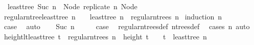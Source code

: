\begin{isabellebody}
\ \ {\isachardoublequoteopen}least{\isacharunderscore}{\kern0pt}tree\ {\isacharparenleft}{\kern0pt}Suc\ n{\isacharparenright}{\kern0pt}\ {\isacharequal}{\kern0pt}\ Node\ {\isacharparenleft}{\kern0pt}replicate\ n\ {\isacharparenleft}{\kern0pt}Node\ {\isacharbrackleft}{\kern0pt}{\isacharbrackright}{\kern0pt}{\isacharparenright}{\kern0pt}{\isacharparenright}{\kern0pt}{\isachardoublequoteclose}\isanewline
\isanewline
{}\isamarkupfalse%
\ regular{\isacharunderscore}{\kern0pt}n{\isacharunderscore}{\kern0pt}tree{\isacharunderscore}{\kern0pt}least{\isacharunderscore}{\kern0pt}tree{\isacharcolon}{\kern0pt}\ {\isachardoublequoteopen}n\ {\isasymnoteq}\ {}\ {\isasymLongrightarrow}\ least{\isacharunderscore}{\kern0pt}tree\ n\ {\isasymin}\ regular{\isacharunderscore}{\kern0pt}n{\isacharunderscore}{\kern0pt}trees\ n{\isachardoublequoteclose}\isanewline
%
\isadelimproof
%
\endisadelimproof
%
\isatagproof
{}\isamarkupfalse%
\ {\isacharparenleft}{\kern0pt}induction\ n{\isacharparenright}{\kern0pt}\isanewline
\ \ \isamarkupfalse%
\ {}\isanewline
\ \ \isamarkupfalse%
\ \isamarkupfalse%
\ {\isacharquery}{\kern0pt}case\ \isamarkupfalse%
\ auto\isanewline
{}\isamarkupfalse%
\isanewline
\ \ \isamarkupfalse%
\ {\isacharparenleft}{\kern0pt}Suc\ n{\isacharparenright}{\kern0pt}\isanewline
\ \ \isamarkupfalse%
\ \isamarkupfalse%
\ {\isacharquery}{\kern0pt}case\ \isamarkupfalse%
\ regular{\isacharunderscore}{\kern0pt}n{\isacharunderscore}{\kern0pt}trees{\isacharunderscore}{\kern0pt}def\ n{\isacharunderscore}{\kern0pt}trees{\isacharunderscore}{\kern0pt}def\ \isamarkupfalse%
\ {\isacharparenleft}{\kern0pt}cases\ n{\isacharparenright}{\kern0pt}\ auto\isanewline
{}\isamarkupfalse%
%
\endisatagproof
{\isafoldproof}%
%
\isadelimproof
\isanewline
%
\endisadelimproof
\isanewline
{}\isamarkupfalse%
\ height{\isacharunderscore}{\kern0pt}lt{\isacharunderscore}{\kern0pt}{}{\isacharunderscore}{\kern0pt}least{\isacharunderscore}{\kern0pt}tree{\isacharcolon}{\kern0pt}\ {\isachardoublequoteopen}t\ {\isasymin}\ regular{\isacharunderscore}{\kern0pt}n{\isacharunderscore}{\kern0pt}trees\ n\ {\isasymLongrightarrow}\ height\ t\ {\isacharless}{\kern0pt}\ {}\ {\isasymLongrightarrow}\ t\ {\isacharequal}{\kern0pt}\ least{\isacharunderscore}{\kern0pt}tree\ n{\isachardoublequoteclose}\isanewline
%
\isadelimproof
%
\endisadelimproof
%
\isatagproof

\end{isabellebody}

